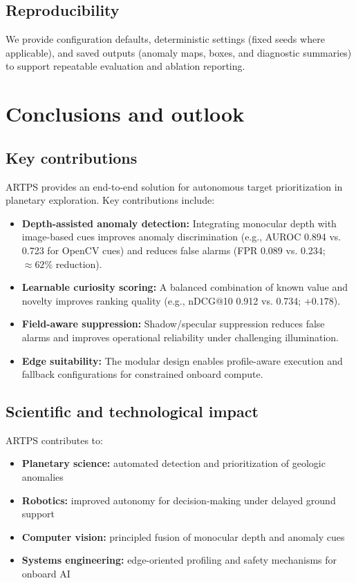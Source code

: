 \documentclass[12pt]{article}
\begin{document}
\subsection{Reproducibility}
We provide configuration defaults, deterministic settings (fixed seeds where applicable), and saved outputs (anomaly maps, boxes, and diagnostic summaries) to support repeatable evaluation and ablation reporting.

\section{Conclusions and outlook}
\subsection{Key contributions}
ARTPS provides an end-to-end solution for autonomous target prioritization in planetary exploration. Key contributions include:

\begin{itemize}
\item \textbf{Depth-assisted anomaly detection:} Integrating monocular depth with image-based cues improves anomaly discrimination (e.g., AUROC 0.894 vs. 0.723 for OpenCV cues) and reduces false alarms (FPR 0.089 vs. 0.234; \(\approx 62\%\) reduction).

\item \textbf{Learnable curiosity scoring:} A balanced combination of known value and novelty improves ranking quality (e.g., nDCG@10 0.912 vs. 0.734; \(+0.178\)).

\item \textbf{Field-aware suppression:} Shadow/specular suppression reduces false alarms and improves operational reliability under challenging illumination.

\item \textbf{Edge suitability:} The modular design enables profile-aware execution and fallback configurations for constrained onboard compute.
\end{itemize}

\subsection{Scientific and technological impact}
ARTPS contributes to:

\begin{itemize}
\item \textbf{Planetary science:} automated detection and prioritization of geologic anomalies
\item \textbf{Robotics:} improved autonomy for decision-making under delayed ground support
\item \textbf{Computer vision:} principled fusion of monocular depth and anomaly cues
\item \textbf{Systems engineering:} edge-oriented profiling and safety mechanisms for onboard AI
\end{itemize}
\end{document}
